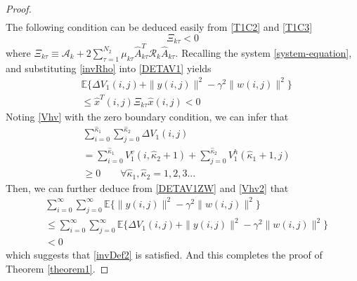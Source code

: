 \documentclass[journal,final,twocolumn]{IEEEtran}
\newtheorem{remark}{Remark}
\begin{document}
\begin{proof}
\begin{equation}
\begin{split}
		\end{split}
	\end{equation} 
	The following condition can be deduced easily from \eqref{T1C2} and \eqref{T1C3}
	\begin{equation}\label{T1P4}
	\mathcal{\varXi}_{k\tau }<0
	\end{equation}	
	where $\mathcal{\varXi}_{k\tau } \equiv \mathcal{A}_{k} +2\sum_{\tau =1}^{N_{2}}\mu_{k\tau }\hat{A}^{T}_{k\tau }\mathcal{R}_{k}\hat{A}_{k\tau }$. 
	Recalling the system \eqref{system-equation}, and substituting \eqref{invRho} into \eqref{DETAV1} yields
	\begin{equation}\label{DETAV1ZW}
		\begin{split}
			&\mathbb{E}\{\varDelta V_{1}(i,j)+\|y(i,j)\|^{2}-\gamma^{2}\|w(i,j)\|^{2}  \}\\
			&\leq \hat{x}^{T}(i,j)\mathcal{\varXi}_{k\tau } \hat{x}(i,j)<0
		\end{split}
	\end{equation}
	Noting \eqref{Vhv} with the zero boundary condition, we can infer that
	\begin{equation} \label{Vhv2}
	\begin{split}
	&\sum_{i=0}^{\hat{\kappa}_{1}}\sum_{j=0}^{\hat{\kappa}_{2}}  \varDelta V_{1}(i,j)\\
	&=\sum_{i=0}^{\hat{\kappa}_{1}}V^{v}_{1}(i,\hat{\kappa}_{2}+1) + \sum_{j=0}^{\hat{\kappa}_{2}}V^{h}_{1}(\hat{\kappa}_{1}+1,j) \\
	&\geq 0 \qquad \forall \hat{\kappa}_{1},\hat{\kappa}_{2} = 1,2,3...
	\end{split}
	\end{equation}
	Then, we can further deduce from \eqref{DETAV1ZW} and \eqref{Vhv2} that 
	\begin{equation}\label{DETAV1ZW2}
	\begin{split}
	&\sum_{i=0}^{\infty}\sum_{j=0}^{\infty}  \mathbb{E}\{\|y(i,j)\|^{2}-\gamma^{2}\|w(i,j)\|^{2}  \}\\
	&\leq \sum_{i=0}^{\infty}\sum_{j=0}^{\infty}  \mathbb{E}\{\varDelta V_{1}(i,j)+\|y(i,j)\|^{2}-\gamma^{2}\|w(i,j)\|^{2}  \}  \\
	&< 0
	\end{split}
	\end{equation}
	which suggests that \eqref{invDef2} is satisfied. And this completes the proof of Theorem \ref{theorem1}.
	
	
\end{proof}
\end{document}
